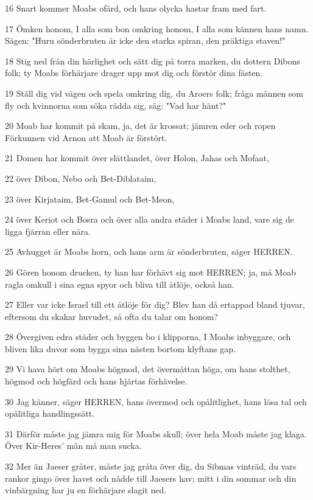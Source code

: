 \par 16 Snart kommer Moabs ofärd, och hans olycka hastar fram med fart.
\par 17 Ömken honom, I alla som bon omkring honom, I alla som kännen hans namn. Sägen: "Huru sönderbruten är icke den starka spiran, den präktiga staven!"
\par 18 Stig ned från din härlighet och sätt dig på torra marken, du dottern Dibons folk; ty Moabs förhärjare drager upp mot dig och förstör dina fästen.
\par 19 Ställ dig vid vägen och spela omkring dig, du Aroers folk; fråga männen som fly och kvinnorna som söka rädda sig, säg: "Vad har hänt?"
\par 20 Moab har kommit på skam, ja, det är krossat; jämren eder och ropen Förkunnen vid Arnon att Moab är förstört.
\par 21 Domen har kommit över slättlandet, över Holon, Jahas och Mofaat,
\par 22 över Dibon, Nebo och Bet-Diblataim,
\par 23 över Kirjataim, Bet-Gamul och Bet-Meon,
\par 24 över Keriot och Bosra och över alla andra städer i Moabs land, vare sig de ligga fjärran eller nära.
\par 25 Avhugget är Moabs horn, och hans arm är sönderbruten, säger HERREN.
\par 26 Gören honom drucken, ty han har förhävt sig mot HERREN; ja, må Moab ragla omkull i sina egna spyor och bliva till åtlöje, också han.
\par 27 Eller var icke Israel till ett åtlöje för dig? Blev han då ertappad bland tjuvar, eftersom du skakar huvudet, så ofta du talar om honom?
\par 28 Övergiven edra städer och byggen bo i klipporna, I Moabs inbyggare, och bliven lika duvor som bygga sina nästen bortom klyftans gap.
\par 29 Vi hava hört om Moabs högmod, det övermåttan höga, om hans stolthet, högmod och högfärd och hans hjärtas förhävelse.
\par 30 Jag känner, säger HERREN, hans övermod och opålitlighet, hans lösa tal och opålitliga handlingssätt.
\par 31 Därför måste jag jämra mig för Moabs skull; över hela Moab måste jag klaga. Över Kir-Heres' män må man sucka.
\par 32 Mer än Jaeser gråter, måste jag gråta över dig, du Sibmas vinträd, du vars rankor gingo över havet och nådde till Jaesers hav; mitt i din sommar och din vinbärgning har ju en förhärjare slagit ned.
